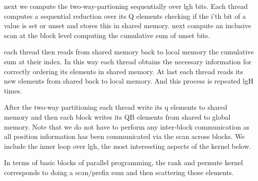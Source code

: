 \documentclass{article}
\begin{document}
next we compute the two-way-partioning sequentially over lgh bits. 
Each thread computes a sequential reduction over its Q elements checking if the i'th bit of a value is set or unset and stores this in shared memory. 
next compute an inclusive scan at the block level computing the cumulative sum of unset bits. 

each thread then reads from shared memory back to local memory the cumulative sum at their index. 
In this way each thread obtains the necessary information for correctly ordering its elements in shared memory. 
At last each thread reads its new elements from shared back to local memory. And this process is repeated lgH times.

After the two-way partitioning each thread write its q elements to shared memory and then each block writes its QB elements from shared to global memory. 
Note that we do not have to perform any inter-block communication as all position information has been communicated via the scan across blocks.
We include the inner loop over lgh, the most interessting aspects of the kernel below.

In terms of basic blocks of parallel programming, the rank and permute kernel corresponds to doing a scan/prefix sum and then scattering those elements. 
\newpage
\end{document}
